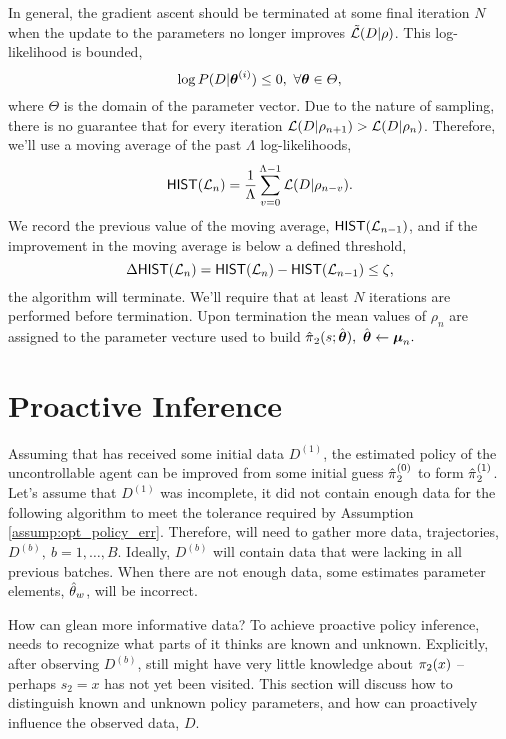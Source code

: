     In general, the gradient ascent should be terminated at some final iteration $N$ when the update to the parameters
    no longer improves
    $\tilde{\mathcal{L}}(D|\rho)$. This log-likelihood is bounded,
    \[
    \log P(D|\boldsymbol{\mathbb{\theta}}^{(i)}) \leq 0,\  \forall \boldsymbol{\mathbb{\theta}} \in \varTheta,
    \]
    where $\varTheta$ is the domain of the parameter vector. Due to the nature of sampling, there is no guarantee that
    for every iteration $\mathcal{L}(D|\rho_{n+1})> \mathcal{L}(D|\rho_n)$. Therefore, we'll use a moving average of the past
    $\Lambda$ log-likelihoods,
    \[
    \mathsf{HIST}(\mathcal{L}_n)=\frac{1}{\Lambda}\sum_{v=0}^{\Lambda-1}\mathcal{L}(D|\rho_{n-v}).
    \]
    We record the previous value of the moving average, $\mathsf{HIST}(\mathcal{L}_{n-1})$, and if the improvement in the
    moving average is below a defined threshold,
    \[
    \Delta\mathsf{HIST}(\mathcal{L}_n) = \mathsf{HIST}(\mathcal{L}_n) - \mathsf{HIST}(\mathcal{L}_{n-1}) \leq \zeta,
    \]
    the algorithm will terminate. We'll require that at least $N$ iterations are performed before termination. Upon
    termination the mean values of $\rho_{n}$ are assigned to the parameter vecture used to build
    $\estimate{\policy{}}_{2}(s;\estimate{\paramVec}),\ \estimate{\paramVec} \leftarrow \vect{\mu}_n.$


\section{Proactive Inference}

    Assuming that  has received some initial data $D^{(1)}$, the estimated policy of the uncontrollable agent
can be improved from some initial guess $\hat{\pi_{}}_2^{(0)}$ to form $\hat{\pi_{}}_2^{(1)}$. Let's
assume that $D^{(1)}$ was incomplete, it did not contain enough data for the following algorithm to meet the
tolerance required by Assumption \ref{assump:opt_policy_err}. Therefore,  will need to gather more data,
trajectories, $D^{(b)},\ b=1,\ldots,B$. Ideally, $D^{(b)}$ will contain data that were lacking in all previous
batches. When there are not enough data, some estimates parameter elements, $\hat{\theta}_{w}$, will be
incorrect.

How can  glean more informative data? To achieve proactive policy inference,  needs to recognize what
parts of  it thinks are known and unknown. Explicitly, after observing $D^{(b)}$,  still might have
very little knowledge about $\pi_{2}(x)$ -- perhaps $s_2=x$ has not yet been visited. This section will discuss how
to distinguish known and unknown policy parameters, and how  can proactively influence the observed data, $D$.


